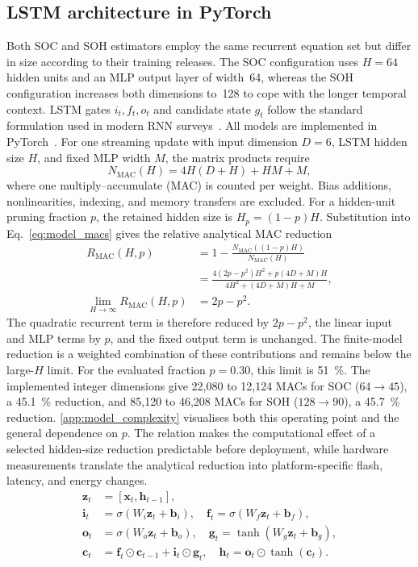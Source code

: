 \documentclass[review]{elsarticle}
\begin{document}
\subsection{LSTM architecture in PyTorch}
Both SOC and SOH estimators employ the same recurrent equation set but differ in size according to their training releases. The SOC configuration uses $H=64$ hidden units and an MLP output layer of width~64, whereas the SOH configuration increases both dimensions to~128 to cope with the longer temporal context. LSTM gates $i_t,f_t,o_t$ and candidate state $g_t$ follow the standard formulation used in modern RNN surveys~\cite{liptonCriticalReviewRecurrent2015}. All models are implemented in PyTorch~\cite{paszkePyTorchImperativeStyle2019}.
For one streaming update with input dimension $D=6$, LSTM hidden size $H$, and fixed MLP width $M$, the matrix products require
\begin{equation}
    N_{\mathrm{MAC}}(H)=4H(D+H)+HM+M,
    \label{eq:model_macs}
\end{equation}
where one multiply--accumulate (MAC) is counted per weight. Bias additions, nonlinearities, indexing, and memory transfers are excluded. For a hidden-unit pruning fraction $p$, the retained hidden size is $H_p=(1-p)H$. Substitution into Eq.~\eqref{eq:model_macs} gives the relative analytical MAC reduction
\begin{align*}
    R_{\mathrm{MAC}}(H,p)
    &=1-\frac{N_{\mathrm{MAC}}((1-p)H)}{N_{\mathrm{MAC}}(H)}\\
    &=\frac{4(2p-p^2)H^2+p(4D+M)H}
    {4H^2+(4D+M)H+M},\\
    \lim_{H\rightarrow\infty}R_{\mathrm{MAC}}(H,p)&=2p-p^2.
\end{align*}
The quadratic recurrent term is therefore reduced by $2p-p^2$, the linear input and MLP terms by $p$, and the fixed output term is unchanged. The finite-model reduction is a weighted combination of these contributions and remains below the large-$H$ limit. For the evaluated fraction $p=0.30$, this limit is 51~\%. The implemented integer dimensions give 22,080 to 12,124 MACs for SOC ($64\rightarrow45$), a 45.1~\% reduction, and 85,120 to 46,208 MACs for SOH ($128\rightarrow90$), a 45.7~\% reduction. \ref{app:model_complexity} visualises both this operating point and the general dependence on $p$. The relation makes the computational effect of a selected hidden-size reduction predictable before deployment, while hardware measurements translate the analytical reduction into platform-specific flash, latency, and energy changes.
\begin{align}
    \mathbf{z}_t &= [\mathbf{x}_t,\mathbf{h}_{t-1}],\\
    \mathbf{i}_t &= \sigma(W_i \mathbf{z}_t + \mathbf{b}_i), \quad
    \mathbf{f}_t = \sigma(W_f \mathbf{z}_t + \mathbf{b}_f), \nonumber\\
    \mathbf{o}_t &= \sigma(W_o \mathbf{z}_t + \mathbf{b}_o), \quad
    \mathbf{g}_t = \tanh(W_g \mathbf{z}_t + \mathbf{b}_g), \nonumber\\
    \mathbf{c}_t &= \mathbf{f}_t \odot \mathbf{c}_{t-1} + \mathbf{i}_t \odot \mathbf{g}_t,\quad
    \mathbf{h}_t = \mathbf{o}_t \odot \tanh(\mathbf{c}_t). \nonumber
\end{align}
\end{document}
